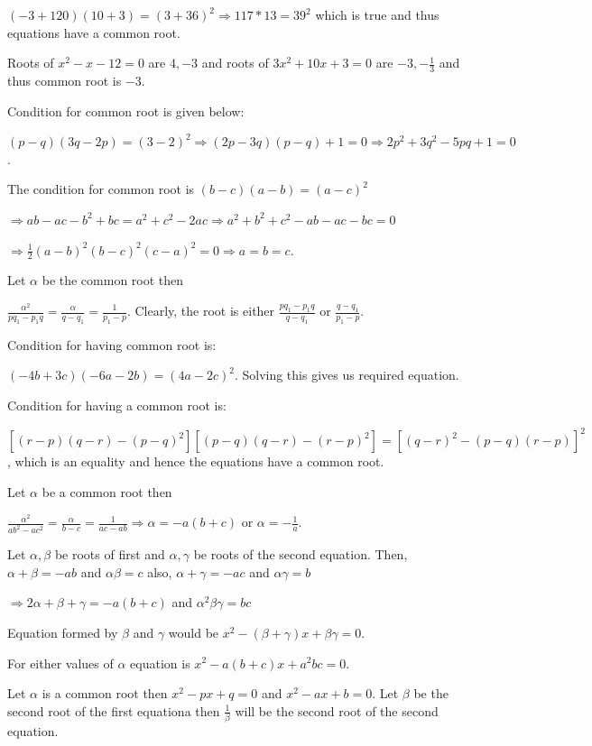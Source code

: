   $(-3 + 120)(10 + 3) = (3 + 36)^2\Rightarrow 117 * 13 = 39^2$ which is true and thus equations have a
  common root.

  Roots of $x^2 - x - 12 = 0$ are $4, -3$ and roots of $3x^2 + 10x + 3 = 0$ are $-3, -\frac{1}{3}$ and thus
  common root is $-3$.
\item Condition for common root is given below:

  $(p - q)(3q - 2p) = (3 - 2)^2\Rightarrow (2p - 3q)(p - q) + 1 = 0\Rightarrow 2p^2 + 3q^2 - 5pq + 1 = 0$.
\item The condition for common root is $(b - c)(a - b) =  (a - c)^2$

  $\Rightarrow ab - ac - b^2 + bc = a^2 + c^2 - 2ac\Rightarrow a^2 + b^2 + c^2 - ab - ac - bc = 0$

  $\Rightarrow \frac{1}{2}(a - b)^2(b - c)^2(c - a)^2 = 0\Rightarrow a = b = c$.
\item Let $\alpha$ be the common root then

  $\frac{\alpha^2}{pq_1 - p_1q} = \frac{\alpha}{q - q_1} = \frac{1}{p_1 - p}$. Clearly, the root is either
  $\frac{pq_1 - p_1q}{q - q_1}$ or $\frac{q - q_1}{p_1 - p}$.
\item Condition for having common root is:

  $(-4b + 3c)(-6a - 2b) = (4a - 2c)^2$. Solving this gives us required equation.
\item Condition for having a common root is:

  $[(r - p)(q - r) - (p - q)^2][(p - q)(q - r) - (r - p)^2] = [(q - r)^2 - (p - q)(r - p)]^2$, which is an
  equality and hence the equations have a common root.
\item Let $\alpha$ be a common root then

  $\frac{\alpha^2}{ab^2 - ac^2} = \frac{\alpha}{b - c} = \frac{1}{ac - ab}\Rightarrow \alpha = -a(b + c)$ or
  $\alpha = -\frac{1}{a}$.

  Let $\alpha, \beta$ be roots of first and $\alpha, \gamma$ be roots of the second equation. Then,
  $\alpha + \beta = -ab$ and $\alpha\beta = c$ also, $\alpha + \gamma = -ac$ and
  $\alpha\gamma = b$

  $\Rightarrow 2\alpha + \beta + \gamma = -a(b + c)$ and $\alpha^2\beta\gamma = bc$

  Equation formed by $\beta$ and $\gamma$ would be $x^2 - (\beta + \gamma)x + \beta\gamma = 0$.

  For either values of $\alpha$ equation is $x^2 - a(b + c)x + a^2bc = 0$.
\item Let $\alpha$ is a common root then $x^2 - px + q = 0$ and $x^2 - ax + b = 0$. Let $\beta$ be the
  second root of the first equationa then $\frac{1}{\beta}$ will be the second root of the second equation.

